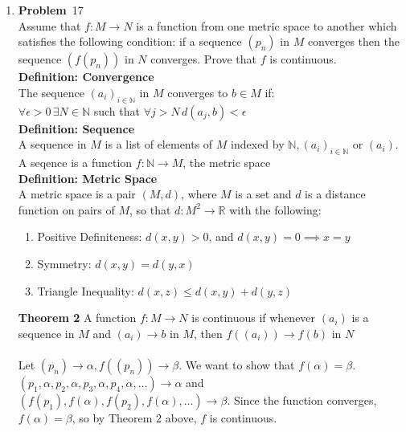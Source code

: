 \documentclass[12pt]{amsart}
\newcommand{\benu}{\begin{enumerate}}
\newcommand{\eenu}{\end{enumerate}}
\theoremstyle{definition}
\newcommand{\mbR}{\mathbb{R}}
\newcommand{\mbN}{\mathbb{N}}
\newcommand{\itep}{\item {\bfseries Problem}\ }
\begin{document}
\begin{enumerate}[series=p]
\itep 17 \\
Assume that $f:M \rightarrow N$ is a function from one metric space to another which satisfies the following condition:  if a sequence $(p_n)$ in $M$ converges then the sequence $(f(p_n))$ in $N$ converges.  Prove that $f$ is continuous.
\\
\textbf{Definition: Convergence}\\
The sequence $(a_i)_{i \in \mbN}$ in $M$ converges to $b \in M$ if:\\
$\forall \epsilon > 0 \, \exists N \in \mbN$ such that $\forall j>N \, d(a_j,b) < \epsilon$
\\
\textbf{Definition: Sequence}\\
A sequence in $M$ is a list of elements of $M$ indexed by $\mbN, (a_i)_{i \in \mbN}$ or $(a_i)$.  A seqence is a function $f : \mbN \to M$, the metric space\\
\textbf{Definition: Metric Space}\\
A metric space is a pair $(M, d)$, where $M$ is a set and $d$ is a distance function on pairs of $M$, so that $d : M^2 \to \mbR$ with the following:
\benu
\item Positive Definiteness: $d(x, y) > 0$, and $d(x, y) = 0 \implies x = y$
\item Symmetry: $d(x, y) = d(y, x)$
\item Triangle Inequality: $d(x, z) \leq d(x,y) + d(y,z)$
\eenu
\textbf{Theorem 2}
A function $f: M \to N$ is continuous if whenever $(a_i)$ is a sequence in $M$ and $(a_i) \to b$ in $M$, then $f((a_i)) \to f(b)$ in $N$\\
\\
Let $(p_n) \to \alpha, f((p_n)) \to \beta$.  We want to show that $f(\alpha) = \beta$.  $(p_1, \alpha, p_2, \alpha,p_3, \alpha,p_4, \alpha, \dots) \to \alpha$ and $(f(p_1), f(\alpha), f(p_2), f(\alpha), \dots) \to \beta$.  Since the function converges, $f(\alpha)=\beta$, so by Theorem 2 above, $f$ is continuous.

\newpage


\end{enumerate}
\end{document}
